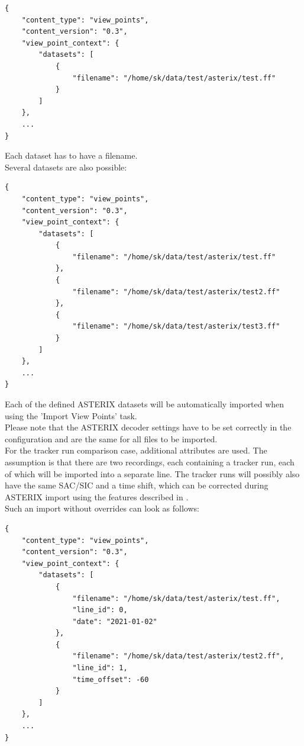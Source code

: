 \begin{lstlisting}[basicstyle=\small\ttfamily]
{
    "content_type": "view_points",
    "content_version": "0.3",
    "view_point_context": {
        "datasets": [
            {
                "filename": "/home/sk/data/test/asterix/test.ff"
            }
        ]
    },
    ...
}
\end{lstlisting}

Each dataset has to have a filename. \\

Several datasets are also possible:
\begin{lstlisting}[basicstyle=\small\ttfamily]
{
    "content_type": "view_points",
    "content_version": "0.3",
    "view_point_context": {
        "datasets": [
            {
                "filename": "/home/sk/data/test/asterix/test.ff"
            },
            {
                "filename": "/home/sk/data/test/asterix/test2.ff"
            },
            {
                "filename": "/home/sk/data/test/asterix/test3.ff"
            }
        ]
    },
    ...
}
\end{lstlisting}

Each of the defined ASTERIX datasets will be automatically imported when using the 'Import View Points' task. \\

Please note that the ASTERIX decoder settings have to be set correctly in the configuration and are the same for all files to be imported. \\

For the tracker run comparison case, additional attributes are used. The assumption is that there are two recordings, each containing a tracker run, each of which will be imported into a separate line. 
The tracker runs will possibly also have the same SAC/SIC and a time shift, which can be corrected during ASTERIX import using the features described in . \\

Such an import without overrides can look as follows:

\begin{lstlisting}[basicstyle=\small\ttfamily]
{
    "content_type": "view_points",
    "content_version": "0.3",
    "view_point_context": {
        "datasets": [
            {
                "filename": "/home/sk/data/test/asterix/test.ff",
                "line_id": 0,
                "date": "2021-01-02"
            },
            {
                "filename": "/home/sk/data/test/asterix/test2.ff",
                "line_id": 1,
                "time_offset": -60
            }
        ]
    },
    ...
}
\end{lstlisting}

